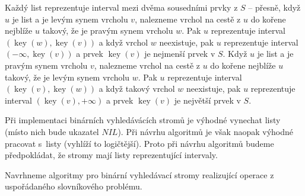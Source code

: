 \documentclass[a4paper,12pt]{article}
\DeclareMathOperator*{\key}{key}
\begin{document}
Každý list reprezentuje interval mezi dvěma 
sousedními prvky z $S$ -- přesně, když $u$ je list a je 
levým synem vrcholu $v$, nalezneme vrchol na cestě z $u$ 
do kořene nejblíže $u$ takový, že je pravým synem 
vrcholu $w$. Pak $u$ repre\-zentuje interval $(\key(w),\key(v))$ a 
když vrchol $w$ neexistuje, pak $u$ repre\-zentuje 
interval $(-\infty ,\key(v))$ a prvek $\key(v)$ je nej\-menší prvek v 
$S$.  Když $u$ je list a je pravým synem vrcholu $v$, 
nalezneme vrchol na cestě z $u$ do kořene nejblíže 
$u$ takový, že je levým synem vrcholu $w$. Pak $u$ repre\-zentuje 
interval $(\key(v),\key(w))$ a když takový vrchol $w$ neexistuje, 
pak $u$ repre\-zentuje interval $(\key(v),+\infty )$ a prvek $\key
(v)$ 
je největší prvek v $S$.  

Při implementaci binárních vyhledávácích 
stromů je výhodné vynechat listy (místo nich bude 
ukazatel $NIL$). Při návrhu algoritmů je však 
naopak výhodné 
pracovat s~listy (vyhlíží to logičtější). Proto při návrhu 
algoritmů budeme předpokládat, že stromy mají 
listy reprezentující intervaly.

Navrhneme algoritmy pro binární vyhledávací stromy 
rea\-lizují\-cí operace z uspořádaného slovníkového problému.
\end{document}
